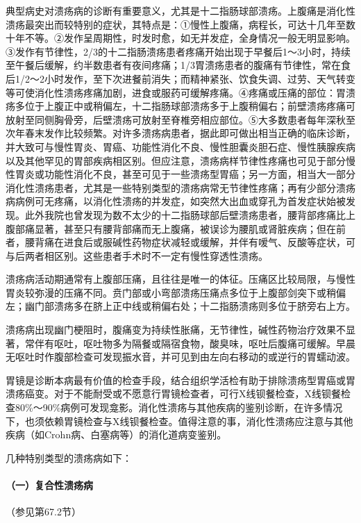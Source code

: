 典型病史对溃疡病的诊断有重要意义，尤其是十二指肠球部溃疡。上腹痛是消化性溃疡最突出而较特别的症状，其特点是：①慢性上腹痛，病程长，可达十几年至数十年不等。②发作呈周期性，时发时愈，如无并发症，全身情况一般无明显影响。③发作有节律性，2/3的十二指肠溃疡患者疼痛开始出现于早餐后1～3小时，持续至午餐后缓解，约半数患者有夜间疼痛；1/3胃溃疡患者的腹痛有节律性，常在食后1/2～2小时发作，至下次进餐前消失；而精神紧张、饮食失调、过劳、天气转变等可使消化性溃疡疼痛加剧，进食或服药可缓解疼痛。④疼痛或压痛的部位：胃溃疡多位于上腹正中或稍偏左，十二指肠球部溃疡多于上腹稍偏右；前壁溃疡疼痛可放射至同侧胸骨旁，后壁溃疡可放射至脊椎旁相应部位。⑤大多数患者每年深秋至次年春末发作比较频繁。对许多溃疡病患者，据此即可做出相当正确的临床诊断，并大致可与慢性胃炎、胃癌、功能性消化不良、慢性胆囊炎胆石症、慢性胰腺疾病以及其他罕见的胃部疾病相区别。但应注意，溃疡病样节律性疼痛也可见于部分慢性胃炎或功能性消化不良，甚至可见于一些溃疡型胃癌；另一方面，相当大一部分消化性溃疡患者，尤其是一些特别类型的溃疡病常无节律性疼痛；再有少部分溃疡病病例可无疼痛，以消化性溃疡的并发症，如突然大出血或穿孔为首发症状始被发现。此外我院也曾发现为数不太少的十二指肠球部后壁溃疡患者，腰背部疼痛比上腹部痛显著，甚至只有腰背部痛而无上腹痛，被误诊为腰肌或肾脏疾病；但在前者，腰背痛在进食后或服碱性药物症状减轻或缓解，并伴有嗳气、反酸等症状，可与后两者相区别。这些患者手术时不一定有慢性穿透性溃疡。

溃疡病活动期通常有上腹部压痛，且往往是唯一的体征。压痛区比较局限，与慢性胃炎较弥漫的压痛不同。贲门部或小弯部溃疡压痛点多位于上腹部剑突下或稍偏左；幽门部溃疡多在脐上正中线或稍偏右处；十二指肠溃疡则多位于脐旁右上方。

溃疡病出现幽门梗阻时，腹痛变为持续性胀痛，无节律性，碱性药物治疗效果不显著，常伴有呕吐，呕吐物多为隔餐或隔宿食物，酸臭味，呕吐后腹痛可缓解。早晨无呕吐时作腹部检查可发现振水音，并可见到由左向右移动的或逆行的胃蠕动波。

胃镜是诊断本病最有价值的检查手段，结合组织学活检有助于排除溃疡型胃癌或胃溃疡癌变。对于不能耐受或不愿意行胃镜检查者，可行X线钡餐检查，X线钡餐检查80\%～90\%病例可发现龛影。消化性溃疡与其他疾病的鉴别诊断，在许多情况下，也须依赖胃镜检查与X线钡餐检查。值得注意的事，消化性溃疡应注意与其他疾病（如Crohn病、白塞病等）的消化道病变鉴别。

几种特别类型的溃疡病如下：

\paragraph{（一）复合性溃疡病}

（参见第67.2节）

